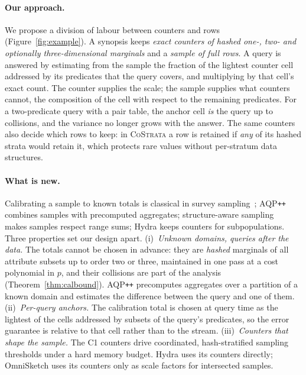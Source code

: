 \documentclass[sigconf]{acmart}
\newcommand{\cs}{\textsc{CoStrata}\xspace}
\newcommand{\omni}{OmniSketch\xspace}
\begin{document}
\paragraph{Our approach.} We propose a division of labour between counters and rows (Figure~\ref{fig:example}).
A synopsis keeps \emph{exact counters of hashed one-, two- and optionally three-dimensional marginals}
and a \emph{sample of full rows}. A query is answered by estimating from the sample the fraction of the
lightest counter cell addressed by its predicates that the query covers, and multiplying by that cell's
exact count. The counter supplies the scale; the sample supplies what counters cannot, the composition of
the cell with respect to the remaining predicates. For a two-predicate query with a pair table, the
anchor cell \emph{is} the query up to collisions, and the variance no longer grows with the answer. The
same counters also decide which rows to keep: in \cs a row is retained if \emph{any} of its hashed strata
would retain it, which protects rare values without per-stratum data structures.

\paragraph{What is new.} Calibrating a sample to known totals is classical in survey
sampling~\cite{sarndal,calibration}; AQP\texttt{++}~\cite{aqppp} combines samples with precomputed
aggregates; structure-aware sampling~\cite{structure-aware} makes samples respect range sums; Hydra keeps
counters for subpopulations. Three properties set our design apart. (i)~\emph{Unknown domains, queries
after the data.} The totals cannot be chosen in advance: they are \emph{hashed} marginals of all attribute
subsets up to order two or three, maintained in one pass at a cost polynomial in $p$, and their collisions
are part of the analysis (Theorem~\ref{thm:calbound}). AQP\texttt{++} precomputes aggregates over a
partition of a known domain and estimates the difference between the query and one of them.
(ii)~\emph{Per-query anchors.} The calibration total is chosen at query time as the lightest of the
cells addressed by subsets of the query's predicates, so the error guarantee is relative to that cell
rather than to the stream. (iii)~\emph{Counters that shape the sample.} The C1 counters drive coordinated,
hash-stratified sampling thresholds under a hard memory budget. Hydra uses its counters directly;
\omni uses its counters only as scale factors for intersected samples.
\end{document}
